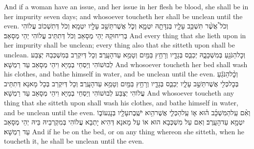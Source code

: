 {And if a woman have an issue, and her issue in her flesh be blood, she shall be in her impurity seven days; and whosoever toucheth her shall be unclean until the even.}{}
{וְכֹל֩ אֲשֶׁ֨ר תִּשְׁכַּ֥ב עָלָ֛יו בְּנִדָּתָ֖הּ יִטְמָ֑א וְכֹ֛ל אֲשֶׁר\maqqaf תֵּשֵׁ֥ב עָלָ֖יו יִטְמָֽא׃}
{וְכֹל דְּתִשְׁכוֹב עֲלוֹהִי בְּרִיחוּקַהּ יְהֵי מְסָאַב וְכֹל דְּתִתֵּיב עֲלוֹהִי יְהֵי מְסָאַב׃}
{And every thing that she lieth upon in her impurity shall be unclean; every thing also that she sitteth upon shall be unclean.}{}
{וְכׇל\maqqaf הַנֹּגֵ֖עַ בְּמִשְׁכָּבָ֑הּ יְכַבֵּ֧ס בְּגָדָ֛יו וְרָחַ֥ץ בַּמַּ֖יִם וְטָמֵ֥א עַד\maqqaf הָעָֽרֶב׃}
{וְכָל דְּיִקְרַב בְּמִשְׁכְּבַהּ יְצַבַּע לְבוּשׁוֹהִי וְיַסְחֵי בְמַיָּא וִיהֵי מְסָאַב עַד רַמְשָׁא׃}
{And whosoever toucheth her bed shall wash his clothes, and bathe himself in water, and be unclean until the even.}{}
{וְכׇ֨ל\maqqaf הַנֹּגֵ֔עַ בְּכׇל\maqqaf כְּלִ֖י אֲשֶׁר\maqqaf תֵּשֵׁ֣ב עָלָ֑יו יְכַבֵּ֧ס בְּגָדָ֛יו וְרָחַ֥ץ בַּמַּ֖יִם וְטָמֵ֥א עַד\maqqaf הָעָֽרֶב׃}
{וְכָל דְּיִקְרַב בְּכָל מָאנָא דְּתִתֵּיב עֲלוֹהִי יְצַבַּע לְבוּשׁוֹהִי וְיַסְחֵי בְמַיָּא וִיהֵי מְסָאַב עַד רַמְשָׁא׃}
{And whosoever toucheth any thing that she sitteth upon shall wash his clothes, and bathe himself in water, and be unclean until the even.}{}
{וְאִ֨ם עַֽל\maqqaf הַמִּשְׁכָּ֜ב ה֗וּא א֧וֹ עַֽל\maqqaf הַכְּלִ֛י אֲשֶׁר\maqqaf הִ֥וא יֹשֶֽׁבֶת\maqqaf עָלָ֖יו בְּנׇגְעוֹ\maqqaf ב֑וֹ יִטְמָ֖א עַד\maqqaf הָעָֽרֶב׃}
{וְאִם עַל מִשְׁכְּבָא הוּא אוֹ עַל מָאנָא דְּהִיא יָתְבָא עֲלוֹהִי בְּמִקְרְבֵיהּ בֵּיהּ יְהֵי מְסָאַב עַד רַמְשָׁא׃}
{And if he be on the bed, or on any thing whereon she sitteth, when he toucheth it, he shall be unclean until the even.}{}
